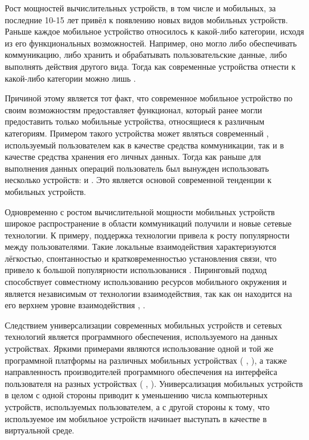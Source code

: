 %
Рост мощностей вычислительных устройств, в том числе и мобильных, за последние 10-15 лет привёл к появлению новых видов мобильных устройств.
%
Раньше каждое мобильное устройство относилось к какой-либо категории, исходя из его функциональных возможностей. Например, оно могло либо обеспечивать коммуникацию, либо хранить и обрабатывать пользовательские данные, либо выполнять действия другого вида.
%
Тогда как современные устройства отнести к какой-либо категории можно лишь .

%
Причиной этому является тот факт, что современное мобильное устройство по своим возможностям предоставляет функционал, который ранее могли предоставить только мобильные устройства, относящиеся к различным категориям.
%
Примером такого устройства может являться современный , используемый пользователем как в качестве средства коммуникации, так и в качестве средства хранения его личных данных.
%
Тогда как раньше для выполнения данных операций пользователь был вынужден использовать несколько устройств:  и . 
%
Это является основой современной тенденции к  мобильных устройств.

%
Одновременно с ростом вычислительной мощности мобильных устройств широкое распространение в области коммуникаций получили и новые сетевые технологии.
%
К примеру, поддержка технологии   привела к росту популярности  между пользователями.
%
Такие локальные взаимодействия характеризуются лёгкостью, спонтанностью и кратковременностью установления связи, что привело к большой популярности использованися  .
%
Пиринговый подход способствует совместному использованию ресурсов мобильного окружения и является независимым от технологии взаимодействия, так как он находится на его верхнем уровне взаимодействия , .

%
Следствием универсализации современных мобильных устройств и сетевых технологий является  программного обеспечения, используемого на данных устройствах.
%
Яркими примерами являются использование одной и той же программной платформы на различных мобильных устройствах ( ,  ), а также направленность производителей программного обеспечения на  интерфейса пользователя на разных устройствах ( ,  ).
%
Универсализация мобильных устройств в целом с одной стороны приводит к уменьшению числа компьютерных устройств, используемых пользователем, а с другой стороны к тому, что используемое им мобильное устройств начинает выступать в качестве  в виртуальной среде.

